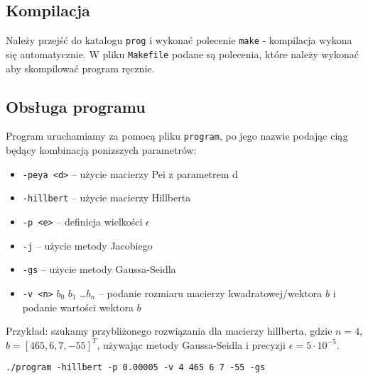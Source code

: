 \documentclass[a4paper,11pt]{article}
\begin{document}
    \subsection{Kompilacja}
    Należy przejść do katalogu \texttt{prog} i wykonać polecenie \texttt{make} - kompilacja wykona się automatycznie. W pliku \texttt{Makefile} podane są polecenia, które należy wykonać aby skompilować program ręcznie.
    
    \subsection{Obsługa programu}
    Program uruchamiamy za pomocą pliku \texttt{program}, po jego nazwie podając ciąg będący kombinacją ponizszych parametrów:
    \begin{itemize}
      \item \texttt{-peya <d>} -- użycie macierzy Pei z parametrem d
      \item \texttt{-hillbert} -- użycie macierzy Hillberta
      \item \texttt{-p <e>} -- definicja wielkości $\epsilon$
      \item \texttt{-j} -- użycie metody Jacobiego
      \item \texttt{-gs} -- użycie metody Gaussa-Seidla
      \item \texttt{-v <n>} $b_0$ $b_1$ \dots $b_n$ -- podanie rozmiaru macierzy kwadratowej/wektora $b$ i podanie wartości wektora $b$
      
    \end{itemize}
    
    Przykład: szukamy przybliżonego rozwiązania dla macierzy hillberta, gdzie $ n = 4 $, $ b = [465, 6, 7, -55]^T $, używając metody Gaussa-Seidla i precyzji $ \epsilon = 5 \cdot 10^{-5} $.
    \begin{center}
      \texttt{./program -hillbert -p 0.00005 -v 4 465 6 7 -55 -gs}
    \end{center}

 
\end{document}
